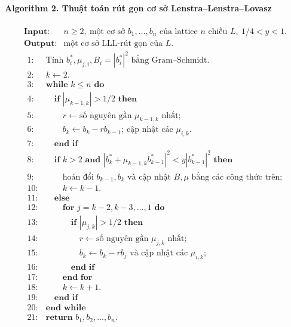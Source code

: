 \documentclass[11pt]{article}
\begin{document}
\paragraph{Algorithm 2. Thuật toán rút gọn cơ sở Lenstra--Lenstra--Lovasz}
\[
\begin{array}{ll}
\textbf{Input:} & n\ge2,\ \text{một cơ sở } b_1,\ldots,b_n
                 \text{ của lattice } n\text{ chiều } L,\ 1/4<y<1.\\
\textbf{Output:} & \text{một cơ sở LLL-rút gọn của } L.
\end{array}
\]
\[
\begin{array}{rl}
1:& \text{Tính } b_i^*,\mu_{j,i},B_i=|b_i^*|^2 \text{ bằng Gram--Schmidt.}\\
2:& k\leftarrow 2.\\
3:& \textbf{while } k\le n \textbf{ do}\\
4:& \quad \textbf{if } |\mu_{k-1,k}|>1/2 \textbf{ then}\\
5:& \quad\quad r\leftarrow \text{số nguyên gần } \mu_{k-1,k} \text{ nhất};\\
6:& \quad\quad b_k\leftarrow b_k-rb_{k-1};\ \text{cập nhật các } \mu_{i,k}.\\
7:& \quad \textbf{end if}\\
8:& \quad \textbf{if } k>2 \textbf{ and }
        |b_k^*+\mu_{k-1,k}b_{k-1}^*|^2<y|b_{k-1}^*|^2 \textbf{ then}\\
9:& \quad\quad \text{hoán đổi } b_{k-1},b_k
        \text{ và cập nhật } B,\mu \text{ bằng các công thức trên};\\
10:& \quad\quad k\leftarrow k-1.\\
11:& \quad \textbf{else}\\
12:& \quad\quad \textbf{for } j=k-2,k-3,\ldots,1 \textbf{ do}\\
13:& \quad\quad\quad \textbf{if } |\mu_{j,k}|>1/2 \textbf{ then}\\
14:& \quad\quad\quad\quad r\leftarrow \text{số nguyên gần } \mu_{j,k} \text{ nhất};\\
15:& \quad\quad\quad\quad b_k\leftarrow b_k-rb_j
        \text{ và cập nhật các } \mu_{i,k};\\
16:& \quad\quad\quad \textbf{end if}\\
17:& \quad\quad \textbf{end for}\\
18:& \quad\quad k\leftarrow k+1.\\
19:& \quad \textbf{end if}\\
20:& \textbf{end while}\\
21:& \textbf{return } b_1,b_2,\ldots,b_n.
\end{array}
\]
\end{document}

